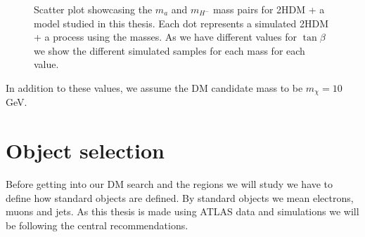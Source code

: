 \documentclass[12pt, a4paper]{book}
\begin{document}
\begin{figure}[!ht]
\begin{subfigure}[b]{0.45\textwidth}
    \end{subfigure}
    \caption[$m_a$ and $m_{H^-}$ mass pairs for 2HDM + a model]{Scatter plot showcasing the $m_a$ and $m_{H^-}$ mass pairs for 2HDM + a model studied in this thesis. Each dot represents a simulated 2HDM + a process using the masses. As we have different values for $\tan\beta$ we show the different simulated samples for each mass for each value.}\label{fig:2HDM_mass}
\end{figure}
In addition to these values, we assume the DM candidate mass to be $m_{\chi}=10$ GeV. 
\section{Object selection}\label{sec:obj_sel}
Before getting into our DM search and the regions we will study we have to define how standard objects are defined. By standard objects we mean electrons, muons and jets. As this thesis is made using ATLAS data and simulations we will be following the central recommendations.%
\end{document}
